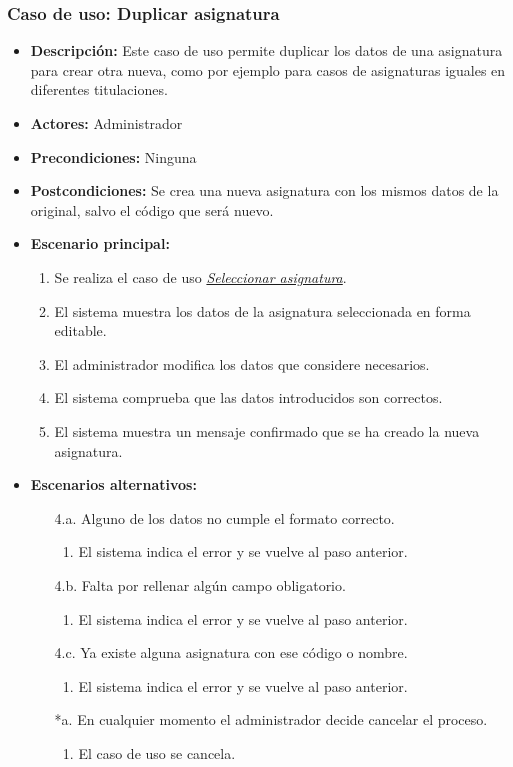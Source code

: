 \documentclass{book}
\begin{document}
\subsubsection*{Caso de uso: Duplicar asignatura}
\label{duplicar_asignatura}
\begin{itemize}
\item{\bf Descripción:} Este caso de uso permite duplicar los datos de una asignatura para crear otra nueva, como por ejemplo para casos de asignaturas iguales en diferentes titulaciones.
\item{\bf Actores:} Administrador
\item{\bf Precondiciones:} Ninguna
\item{\bf Postcondiciones:} Se crea una nueva asignatura con los mismos datos de la original, salvo el código que será nuevo.
\item{\bf Escenario principal:}
	\begin{enumerate}
	\item Se realiza el caso de uso {\em \hyperref[select_asignatura]{Seleccionar asignatura}}.
	\item El sistema muestra los datos de la asignatura seleccionada en forma editable.
	\item El administrador modifica los datos que considere necesarios.
	\item El sistema comprueba que las datos introducidos son correctos.
	\item El sistema muestra un mensaje confirmado que se ha creado la nueva asignatura.
	\end{enumerate}
\item{\bf Escenarios alternativos:}
	\begin{itemize}
	\item[4.a.] Alguno de los datos no cumple el formato correcto.
		\begin{enumerate}
		\item El sistema indica el error y se vuelve al paso anterior.
		\end{enumerate}
	\item[4.b.] Falta por rellenar algún campo obligatorio.
		\begin{enumerate}
		\item El sistema indica el error y se vuelve al paso anterior.
		\end{enumerate}
	\item[4.c.] Ya existe alguna asignatura con ese código o nombre.
		\begin{enumerate}
		\item El sistema indica el error y se vuelve al paso anterior.
		\end{enumerate}
	\item[*a.] En cualquier momento el administrador decide cancelar el proceso.
		\begin{enumerate}
		\item El caso de uso se cancela.
		\end{enumerate}
	\end{itemize}
\end{itemize}
\end{document}

